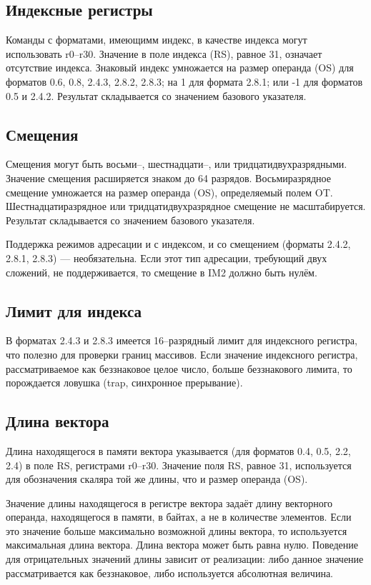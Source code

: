 \documentclass[forwardcom.tex]{subfiles}
\begin{document}
\subsection{Индексные регистры}
Команды с форматами, имеющимм индекс, в качестве индекса могут использовать r0--r30. Значение в поле индекса (RS), равное 31, означает отсутствие индекса. Знаковый индекс умножается на размер операнда (OS) для форматов 0.6, 0.8, 2.4.3, 2.8.2, 2.8.3; на 1 для формата 2.8.1; или -1 для форматов 0.5 и 2.4.2. Результат складывается со значением базового указателя.

\subsection{Смещения}
Смещения могут быть восьми--, шестнадцати--, или тридцатидвухразрядными. Значение смещения расширяется знаком до 64 разрядов. Восьмиразрядное смещение умножается на размер операнда (OS), определяемый полем OT. Шестнадцатиразрядное или тридцатидвухразрядное смещение не масштабируется. Результат складывается со значением базового указателя.

Поддержка режимов адресации и с индексом, и со смещением (форматы  2.4.2, 2.8.1, 2.8.3) --- необязательна. Если этот тип адресации, требующий двух сложений, не поддерживается, то смещение в IM2 должно быть нулём.

\subsection{Лимит для индекса}
В форматах 2.4.3 и 2.8.3 имеется 16--разрядный лимит для индексного регистра, что полезно для проверки границ массивов. Если значение индексного регистра, рассматриваемое как беззнаковое целое число, больше беззнакового лимита, то порождается ловушка (trap, синхронное прерывание).

\subsection{Длина вектора}
Длина находящегося в памяти вектора указывается (для форматов 0.4, 0.5, 2.2, 2.4) в поле RS, регистрами r0--r30. Значение поля RS, равное 31, используется для обозначения скаляра той же длины, что и размер операнда (OS).

Значение длины находящегося в регистре вектора задаёт длину векторного операнда, находящегося в памяти, в байтах, а не в количестве элементов. Если это значение больше максимально возможной длины вектора, то используется максимальная длина вектора. Длина вектора может быть равна нулю. Поведение для отрицательных значений длины зависит от реализации: либо данное значение рассматривается как беззнаковое, либо используется абсолютная величина.
\end{document}
